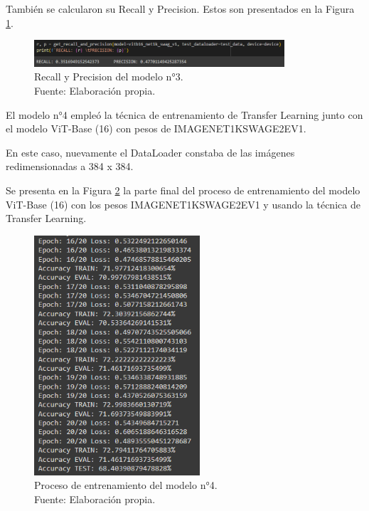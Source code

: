 También se calcularon su Recall y Precision. Estos son presentados en la Figura \ref{4:fig125}.

\begin{figure}[H]
	\begin{center}
		\includegraphics[width=0.83\textwidth]{4/figures/model3_rp.PNG}
		\caption[Recall y Precision del modelo n°3]{Recall y Precision del modelo n°3. \\
		Fuente: Elaboración propia.}
		\label{4:fig125}
	\end{center}
\end{figure}

El modelo n°4 empleó la técnica de entrenamiento de Transfer Learning junto con el modelo ViT-Base (16) con pesos de IMAGENET1KSWAGE2EV1.

En este caso, nuevamente el DataLoader constaba de las imágenes redimensionadas a 384 x 384.

Se presenta en la Figura \ref{4:fig126} la parte final del proceso de entrenamiento del modelo ViT-Base (16) con los pesos IMAGENET1KSWAGE2EV1 y usando la técnica de Transfer Learning.

\begin{figure}[H]
	\begin{center}
		\includegraphics[width=0.55\textwidth]{4/figures/model4_train.PNG}
		\caption[Proceso de entrenamiento del modelo n°4]{Proceso de entrenamiento del modelo n°4. \\
		Fuente: Elaboración propia.}
		\label{4:fig126}
	\end{center}
\end{figure}

